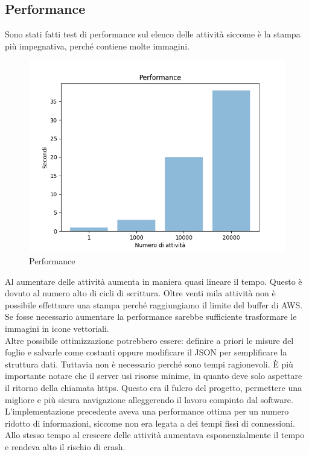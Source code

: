 \documentclass[12pt]{article}
\begin{document}
\subsection{Performance}
Sono stati fatti test di performance sul elenco delle attività siccome è la 
stampa più impegnativa, perché contiene molte immagini.  
\begin{figure}[H]
\includegraphics[width =\textwidth]{performance.png}
\caption{Performance}
\label{fig:mesh6}
\end{figure}
Al aumentare delle attività aumenta in maniera quasi lineare il tempo. Questo 
è dovuto al numero alto di cicli di scrittura.
Oltre venti mila attività non è possibile effettuare una stampa perché 
raggiungiamo il limite del buffer di AWS. Se fosse necessario aumentare 
la performance sarebbe sufficiente trasformare le immagini in icone vettoriali.
\\ Altre possibile ottimizzazione potrebbero essere: definire a priori le 
misure del foglio e salvarle come costanti oppure modificare il JSON per 
semplificare la struttura dati. 
Tuttavia non è necessario perché sono tempi ragionevoli.
È più importante notare che il server usi risorse minime, in quanto deve 
solo aspettare il ritorno della chiamata https. Questo era il fulcro del progetto, 
permettere una migliore e più sicura navigazione alleggerendo il lavoro compiuto 
dal software.
\\ L'implementazione precedente aveva una performance ottima per un numero ridotto 
di informazioni, 
siccome non era legata a dei tempi fissi di connessioni. Allo stesso tempo al 
crescere delle attività aumentava esponenzialmente il tempo e rendeva alto il 
rischio di crash.
\end{document}
